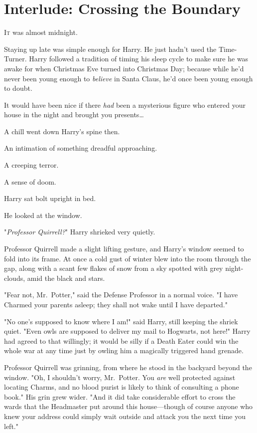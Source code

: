 \chapter{Interlude: Crossing the Boundary}

\lettrine{I}{t} was almost 
midnight.

\quad\quad
Staying up late was simple enough for Harry. He just hadn't used the 
Time-Turner. Harry followed a tradition of timing his sleep cycle to make sure 
he was awake for when Christmas Eve turned into Christmas Day; because while 
he'd never been young enough to \emph{believe} in Santa Claus, he'd once been 
young enough to doubt.

It would have been nice if there \emph{had} been a mysterious figure who 
entered your house in the night and brought you presents{\ldots}

A chill went down Harry's spine then.

An intimation of something dreadful approaching.

A creeping terror.

A sense of doom.

Harry sat bolt upright in bed.

He looked at the window.

"\emph{Professor Quirrell?}" Harry shrieked very quietly.

Professor Quirrell made a slight lifting gesture, and Harry's window seemed to 
fold into its frame. At once a cold gust of winter blew into the room through 
the gap, along with a scant few flakes of snow from a sky spotted with grey 
night-clouds, amid the black and stars.

"Fear not, Mr.~Potter," said the Defense Professor in a normal voice. "I have 
Charmed your parents asleep; they shall not wake until I have departed."

"No one's supposed to know where I am!" said Harry, still keeping the shriek 
quiet. "Even owls are supposed to deliver my mail to Hogwarts, not here!" Harry 
had agreed to that willingly; it would be silly if a Death Eater could win the 
whole war at any time just by owling him a magically triggered hand grenade.

Professor Quirrell was grinning, from where he stood in the backyard beyond the 
window. "Oh, I shouldn't worry, Mr.~Potter. You \emph{are} well protected 
against locating Charms, and no blood purist is likely to think of consulting a 
phone book." His grin grew wider. "And it did take considerable effort to cross 
the wards that the Headmaster put around this house---though of course anyone 
who knew your address could simply wait outside and attack you the next time 
you left."

